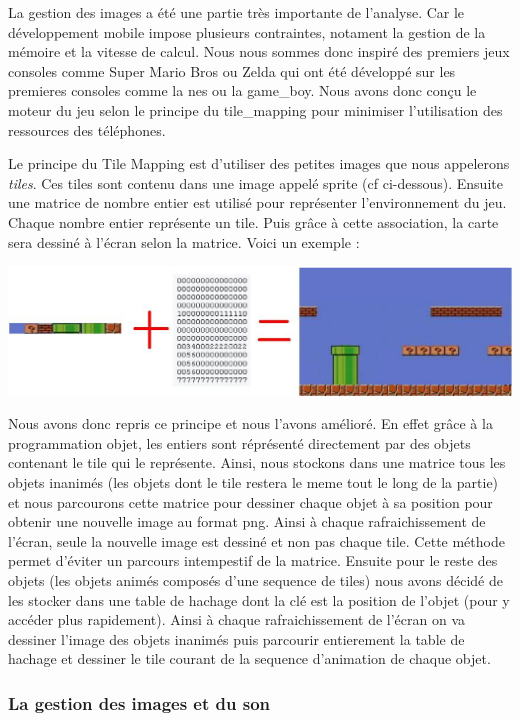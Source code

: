 		La gestion des images a été une partie très importante de l'analyse. Car le développement mobile impose plusieurs contraintes, notament la gestion de la mémoire et la vitesse de calcul. Nous nous sommes donc inspiré des premiers jeux consoles comme Super Mario Bros ou Zelda qui ont été développé sur les premieres consoles comme la \gls{nes} ou la \gls{game_boy}. Nous avons donc conçu le moteur du jeu selon le principe du \gls{tile_mapping} pour minimiser l'utilisation des ressources des téléphones.
		
		Le principe du Tile Mapping est d'utiliser des petites images que nous appelerons \textit{tiles}. Ces tiles sont contenu dans une image appelé sprite (cf ci-dessous).
		Ensuite une matrice de nombre entier est utilisé pour représenter l'environnement du jeu. Chaque nombre entier représente un tile. Puis grâce à cette association, la carte sera dessiné à l'écran selon la matrice. Voici un exemple :
		
		\includegraphics[width=15cm]{./Analyse/Img/tileMapping.eps}
		
		
		Nous avons donc repris ce principe et nous l'avons amélioré. En effet grâce à la programmation objet, les entiers sont réprésenté directement par des objets contenant le tile qui le représente. Ainsi, nous stockons dans une matrice tous les objets inanimés (les objets dont le tile restera le meme tout le long de la partie) et nous parcourons cette matrice pour dessiner chaque objet à sa position pour obtenir une nouvelle image au format png. Ainsi à chaque rafraichissement de l'écran, seule la nouvelle image est dessiné et non pas chaque tile. Cette méthode permet d'éviter un parcours intempestif de la matrice.
		Ensuite pour le reste des objets (les objets animés composés d'une sequence de tiles) nous avons décidé de les stocker dans une table de hachage dont la clé est la position de l'objet (pour y accéder plus rapidement). Ainsi à chaque rafraichissement de l'écran on va dessiner l'image des objets inanimés puis parcourir entierement la table de hachage et dessiner le tile courant de la sequence d'animation de chaque objet.
		
		\subsubsection{La gestion des images et du son}
		
